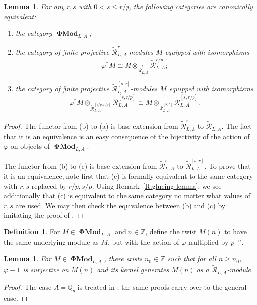 \documentclass[12pt]{amsart}
\newtheorem{lemma}[theorem]{Lemma}
\theoremstyle{definition}
\newtheorem{defn}[theorem]{Definition}
\numberwithin{equation}{theorem}
\newcommand{\QQ}{\mathbb{Q}}
\newcommand{\ZZ}{\mathbb{Z}}
\newcommand{\calR}{\mathcal{R}}
\DeclareMathOperator{\PhiMod}{\mathbf{\Phi Mod}}
\begin{document}
\begin{lemma} \label{L:phi modules bundles}
For any $r,s$ with $0 < s \leq r/p$, the following categories are canonically equivalent:
\begin{enumerate}
\item[(a)]
the category $\PhiMod_{L,A}$;
\item[(b)]
the category of finite projective $\tilde{\calR}^r_{L,A}$-modules $M$ equipped with isomorphisms 
\[
\varphi^* M  \cong 
M \otimes_{\tilde{\calR}^r_{L,A}} \tilde{\calR}^{r/p}_{L,A};
\]
\item[(c)]
the category of finite projective $\tilde{\calR}^{[s,r]}_{L,A}$-modules
$M$ equipped with isomorphisms 
\[
\varphi^* M \otimes_{\tilde{\calR}^{[s/p,r/p]}_{L,A}} \tilde{\calR}^{[s,r/p]}_{L,A} \cong 
M \otimes_{\tilde{\calR}^{[s,r]}_{L,A}} \tilde{\calR}^{[s,r/p]}_{L,A}.
\]
\end{enumerate}
\end{lemma}
\begin{proof}
The functor from (b) to (a) is base extension from $\tilde{\calR}^r_{L,A}$ to $\tilde{\calR}_{L,A}$. The fact that it is an equivalence is an easy consequence of the bijectivity of the action of $\varphi$ on objects of $\PhiMod_{L,A}$.

The functor from (b) to (c) is base extension from $\tilde{\calR}^r_{L,A}$ to $\tilde{\calR}^{[s,r]}_{L,A}$. To prove that it is an equivalence, note first that (c) is formally equivalent to the same category with $r,s$ replaced by $r/p,s/p$. Using 
	Remark~\ref{R:glueing lemma}, we see additionally that (c) is equivalent to the same category no matter what values of $r,s$ are used. We may then check the equivalence between (b) and (c) by imitating the proof of \cite[Proposition~2.2.7]{kpx}.
\end{proof}

\begin{defn}
For $M \in \PhiMod_{L,A}$ and $n \in \ZZ$, define the twist $M(n)$ to have the same underlying module as $M$, but with the action of $\varphi$ multiplied by $p^{-n}$.
\end{defn}

\begin{lemma} \label{L:enough phi-invariants}
For $M \in \PhiMod_{L,A}$, there exists $n_0 \in \ZZ$ such that for all $n \geq n_0$,
$\varphi-1$ is surjective on $M(n)$ and its kernel generates $M(n)$ as a $\tilde{\calR}_{L,A}$-module.
\end{lemma}
\begin{proof}
The case $A = \QQ_p$ is treated in \cite[Proposition~6.2.2, Proposition~6.2.4]{kedlaya-liu1}; the same proofs carry over to the general case.
\end{proof}
\end{document}
